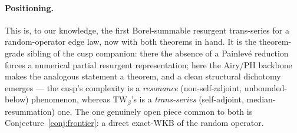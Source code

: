 \documentclass[11pt,reqno]{amsart}
\theoremstyle{plain}
\theoremstyle{definition}
\theoremstyle{remark}
\begin{document}
\paragraph{Positioning.} This is, to our knowledge, the first Borel-summable resurgent trans-series
for a random-operator edge law, now with both theorems in hand. It is the theorem-grade sibling of
the cusp companion: there the absence of a Painlev\'e reduction forces a numerical partial resurgent
representation; here the Airy/PII backbone makes the analogous statement a theorem, and a clean
structural dichotomy emerges --- the cusp's complexity is a \emph{resonance} (non-self-adjoint,
unbounded-below) phenomenon, whereas $\mathrm{TW}_\beta$'s is a \emph{trans-series}
(self-adjoint, median-resummation) one. The one genuinely open piece common to both is
Conjecture~\ref{conj:frontier}: a direct exact-WKB of the random operator.
\end{document}
